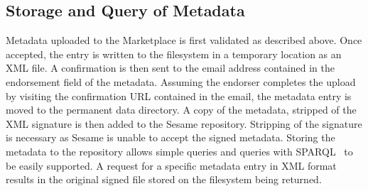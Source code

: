 \subsection{Storage and Query of Metadata}

Metadata uploaded to the Marketplace is first validated as described above. Once accepted, the 
entry is written to the filesystem in a temporary location as an XML file. A confirmation  
is then sent to the email address contained in the endorsement field of the metadata. Assuming 
the endorser completes the upload by visiting the confirmation URL contained in the email, the 
metadata entry is moved to the permanent data directory. A copy of the metadata, stripped of the 
XML signature is then added to the Sesame repository. Stripping of the signature is necessary as 
Sesame is unable to accept the signed metadata. Storing the metadata to the repository allows 
simple queries and queries with SPARQL~\cite{sparql} to be easily supported. A request for a specific 
metadata entry in XML format results in the original signed file stored on the filesystem  being returned.
